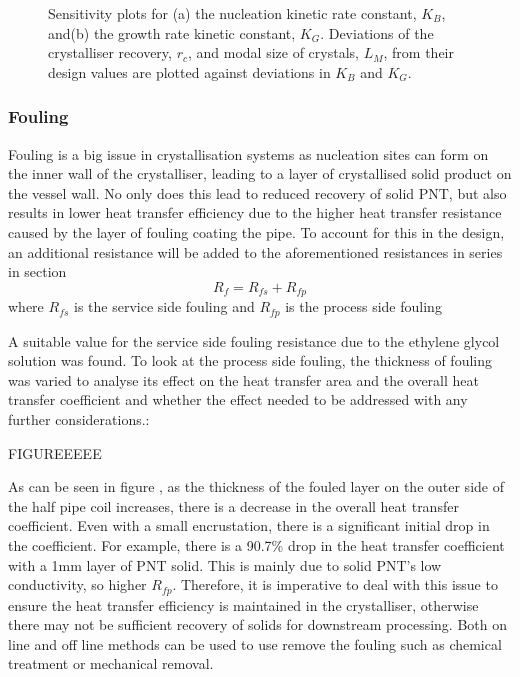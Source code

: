 \begin{figure}[h]
    \centering
    
    \caption{Sensitivity plots for (a) the nucleation kinetic rate constant, $K_B$, and(b) the growth rate kinetic constant, $K_G$. Deviations of the crystalliser recovery, $r_c$, and modal size of crystals, $L_M$, from their design values are plotted against deviations in $K_B$ and $K_G$. }
    \label{fig:sensitivity kinetics}
\end{figure}
   
\subsubsection{Fouling}\label{sec:fouling}

Fouling is a big issue in crystallisation systems as nucleation sites can form on the inner wall of the crystalliser, leading to a layer of crystallised solid product on the vessel wall. No only does this lead to reduced recovery of solid PNT, but also results in lower heat transfer efficiency due to the higher heat transfer resistance caused by the layer of fouling coating the pipe. To account for this in the  design, an additional resistance will be added to the aforementioned resistances in series in section %
\begin{equation} \label{eq:fouling}
    R_f = R_{fs} + R_{fp}
\end{equation}
where $R_{fs}$ is the service side fouling and $R_{fp}$ is the process side fouling 

A suitable value for the service side fouling resistance due to the ethylene glycol solution was found. To look at the process side fouling, the thickness of fouling was varied to analyse its effect on the heat transfer area and the overall heat transfer coefficient and whether the effect needed to be addressed with any further considerations.:

FIGUREEEEE

As can be seen in figure 
, as the thickness of the fouled layer on the outer side of the half pipe coil increases, there is a decrease in the overall heat transfer coefficient. Even with a small encrustation, there is a significant initial drop in the coefficient. For example, there is a 90.7\% drop in the heat transfer coefficient with a 1mm layer of PNT solid. This is mainly due to solid PNT's low conductivity, so higher $R_{fp}$. Therefore, it is imperative to deal with this issue to ensure the heat transfer efficiency is maintained in the crystalliser, otherwise there may not be sufficient recovery of solids for downstream processing. Both on line and off line methods can be used to use remove the fouling such as chemical treatment or mechanical removal. 

